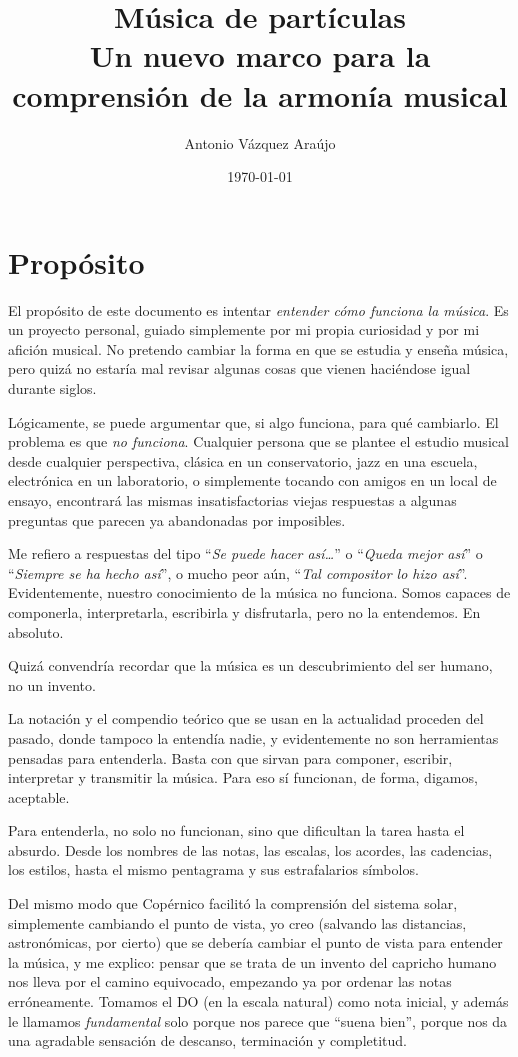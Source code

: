 \documentclass[]{report}
\title{Música de partículas \\[1ex] \large Un nuevo marco para la comprensión de la armonía musical}
\author{Antonio Vázquez Araújo}
\date{\today}
\begin{document}
\maketitle


\tableofcontents
\section{Propósito}
El propósito de este documento es intentar \emph{entender cómo funciona la música}. Es un proyecto personal, guiado simplemente por mi propia curiosidad y por mi afición musical. No pretendo cambiar la forma en que se estudia y enseña música, pero quizá no estaría mal revisar algunas cosas que vienen haciéndose igual durante siglos.

Lógicamente, se puede argumentar que, si algo funciona, para qué cambiarlo. El problema es que \emph{no funciona}. Cualquier persona que se plantee el estudio musical desde cualquier perspectiva, clásica en un conservatorio, jazz en una escuela, electrónica en un laboratorio, o simplemente tocando con amigos en un local de ensayo, encontrará las mismas insatisfactorias viejas respuestas a algunas preguntas que parecen ya abandonadas por imposibles.

Me refiero a respuestas del tipo ``\emph{Se puede hacer   así\ldots{}}'' o ``\emph{Queda mejor así}'' o ``\emph{Siempre se ha hecho así}'', o mucho peor aún, ``\emph{Tal compositor lo hizo así}''. Evidentemente, nuestro conocimiento de la música no funciona. Somos capaces de componerla, interpretarla, escribirla y disfrutarla, pero no la entendemos. En absoluto.

Quizá convendría recordar que la música es un descubrimiento del ser humano, no un invento.

La notación y el compendio teórico que se usan en la actualidad proceden del pasado, donde tampoco la entendía nadie, y evidentemente no son herramientas pensadas para entenderla. Basta con que sirvan para componer, escribir, interpretar y transmitir la música. Para eso sí funcionan, de forma, digamos, aceptable.

Para entenderla, no solo no funcionan, sino que dificultan la tarea hasta el absurdo. Desde los nombres de las notas, las escalas, los acordes, las cadencias, los estilos, hasta el mismo pentagrama y sus estrafalarios símbolos.

Del mismo modo que Copérnico facilitó la comprensión del sistema solar, simplemente cambiando el punto de vista, yo creo (salvando las distancias, astronómicas, por cierto) que se debería cambiar el punto de vista para entender la música, y me explico: pensar que se trata de un invento del capricho humano nos lleva por el camino equivocado, empezando ya por ordenar las notas erróneamente. Tomamos el DO (en la escala natural) como nota inicial, y además le llamamos \emph{fundamental} solo porque nos parece que ``suena bien'', porque nos da una agradable sensación de descanso, terminación y completitud.
\end{document}
